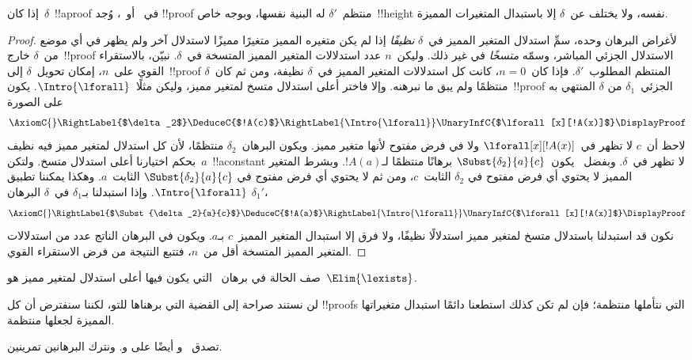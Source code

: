 \documentclass[../../../include/open-logic-section]{subfiles}
\begin{document}
\begin{prop}
إذا كان~$\delta$~!!a{proof} في~ أو~، وُجد
!!{proof} منتظم~$\delta'$ له البنية نفسها، وبوجه خاص~!!{height} نفسه،
ولا يختلف عن~$\delta$ إلا باستبدال المتغيرات المميزة.
\end{prop}

\begin{proof}
لأغراض البرهان وحده، سمِّ استدلال المتغير المميز في~$\delta$
\emph{نظيفًا} إذا لم يكن متغيره المميز متغيرًا مميزًا لاستدلال آخر ولم
يظهر في أي موضع من~$\delta$ خارج~!!{proof} الاستدلال الجزئي المباشر،
وسمّه \emph{متسخًا} في غير ذلك. وليكن~$n$ عدد استدلالات المتغير المميز
المتسخة في~$\delta$. نبيّن، بالاستقراء القوي على~$n$، إمكان تحويل~$\delta$
إلى~!!{proof} المنتظم المطلوب~$\delta'$. فإذا كان~$n=0$، كانت كل
استدلالات المتغير المميز في~$\delta$ نظيفة، ومن ثم كان~$\delta$
منتظمًا ولم يبق ما نبرهنه. وإلا فاختر أعلى استدلال متسخ لمتغير مميز، وليكن
مثلًا~$\Intro{\lforall}$. يكون~!!{proof} الجزئي~$\delta_1$ من
$\delta$ المنتهي به على الصورة
    \[
    \AxiomC{}
    \RightLabel{$\delta_2$}
    \DeduceC{$!A(c)$}
    \RightLabel{\Intro{\lforall}}
    \UnaryInfC{$\lforall[x][!A(x)]$}
    \DisplayProof
    \]
لاحظ أن~$c$ لا تظهر في~$\lforall[x][!A(x)]$ ولا في فرض مفتوح لأنها
متغير مميز. ويكون البرهان~$\delta_2$ منتظمًا، لأن كل استدلال لمتغير
مميز فيه نظيف بحكم اختيارنا أعلى استدلال متسخ. ولتكن~$a$~!!a{constant}
لا تظهر في~$\delta$.
وبفضل~ يكون~$\Subst{\delta_2}{a}{c}$ برهانًا
منتظمًا لـ$!A(a)$. وبشرط المتغير المميز لا يحتوي أي فرض مفتوح في
$\delta_2$ الثابت~$c$، ومن ثم لا يحتوي أي فرض مفتوح في
$\Subst{\delta_2}{a}{c}$ الثابت~$a$. وهكذا يمكننا تطبيق
$\Intro{\lforall}$. وإذا استبدلنا بـ$\delta_1$ في~$\delta$ البرهان
$\delta_1'$،
    \[
    \AxiomC{}
    \RightLabel{$\Subst{\delta_2}{a}{c}$}
    \DeduceC{$!A(a)$}
    \RightLabel{\Intro{\lforall}}
    \UnaryInfC{$\lforall[x][!A(x)]$}
    \DisplayProof
    \]
نكون قد استبدلنا باستدلال متسخ لمتغير مميز استدلالًا نظيفًا، ولا فرق
إلا استبدال المتغير المميز~$c$ بـ$a$. ويكون في البرهان الناتج عدد من
استدلالات المتغير المميز المتسخة أقل من~$n$، فتتبع النتيجة من فرض
الاستقراء القوي.
\end{proof}

\begin{prob}
صف الحالة في برهان~ التي يكون فيها أعلى استدلال
لمتغير مميز هو~$\Elim{\lexists}$.
\end{prob}

لن نستند صراحة إلى القضية التي برهناها للتو، لكننا سنفترض أن كل
!!{proof}s التي نتأملها منتظمة؛ فإن لم تكن كذلك استطعنا دائمًا استبدال
متغيراتها المميزة لجعلها منتظمة.

تصدق~ و أيضًا على
 و. ونترك البرهانين تمرينين.
\end{document}
